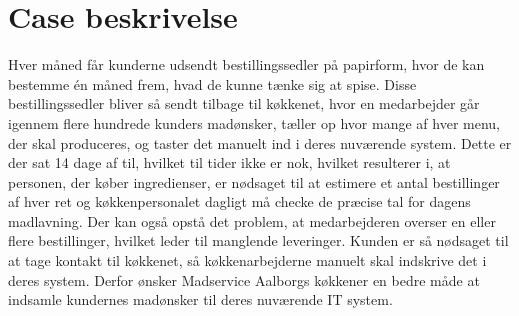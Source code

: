 \section{Case beskrivelse}
Hver måned får kunderne udsendt bestillingssedler på papirform, hvor de kan bestemme én måned frem, hvad de kunne tænke sig at spise.
Disse bestillingssedler bliver så sendt tilbage til køkkenet, hvor en medarbejder går igennem flere hundrede kunders madønsker, tæller op hvor mange af hver menu, der skal produceres, og taster det manuelt ind i deres nuværende system.
Dette er der sat 14 dage af til, hvilket til tider ikke er nok, hvilket resulterer i, at personen, der køber ingredienser, er nødsaget til at estimere et antal bestillinger af hver ret og køkkenpersonalet dagligt må checke de præcise tal for dagens madlavning.
Der kan også opstå det problem, at medarbejderen overser en eller flere bestillinger, hvilket leder til manglende leveringer.
Kunden er så nødsaget til at tage kontakt til køkkenet, så køkkenarbejderne manuelt skal indskrive det i deres system.
Derfor ønsker Madservice Aalborgs køkkener en bedre måde at indsamle kundernes madønsker til deres nuværende IT system.